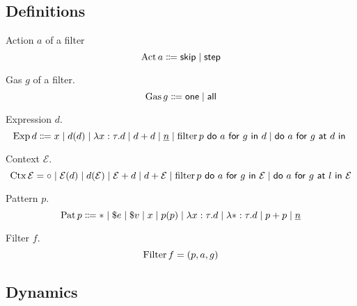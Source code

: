 \subsection{Definitions}


 Action \(a\) of a filter
\[
  \operatorname{Act} a \Coloneqq \mathsf{skip} \mid \mathsf{step}
\]

 Gas \(g\) of a filter.
\[
  \operatorname{Gas} g \Coloneqq \mathsf{one} \mid \mathsf{all}
\]

 Expression \(d\).
\[
  \operatorname{Exp} d \Coloneqq x \mid d(d) \mid \lambda x : \tau . d \mid d + d \mid \underline{n} \mid \operatorname{filter} p ~\mathsf{do}~ a ~\mathsf{for}~ g ~\mathsf{in}~ d \mid \mathsf{do}~ a ~\mathsf{for}~ g ~\mathsf{at}~ d ~\mathsf{in}~ \]

 Context \(\mathcal{E}\).
\[
  \operatorname{Ctx} \mathcal{E}
  = \circ
  \mid \mathcal{E}(d)
  \mid d(\mathcal{E})
  \mid \mathcal{E} + d
  \mid d + \mathcal{E}
  \mid \operatorname{filter} p ~\mathsf{do}~ a ~\mathsf{for}~ g ~\mathsf{in}~ \mathcal{E}
  \mid \mathsf{do}~ a ~\mathsf{for}~ g ~\mathsf{at}~ l ~\mathsf{in}~ \mathcal{E}
\]

 Pattern \(p\).
\[
  \operatorname{Pat} p \Coloneqq \ast \mid \$e \mid \$v \mid x \mid p(p) \mid \lambda x : \tau . d \mid \lambda \ast : \tau . d \mid p + p \mid \underline{n}
\]

 Filter \(f\).
\[
  \operatorname{Filter} f = (p, a, g)
\]

\subsection{Dynamics}

